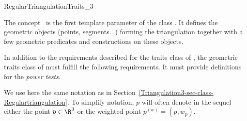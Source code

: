 

\begin{ccRefConcept}{RegularTriangulationTraits_3}

\ccDefinition
The concept \ccRefName\ is the first template parameter of the class
. It defines the geometric objects (points,
segments...) forming the triangulation together with a few geometric
predicates and constructions on these objects.

\ccRefines {}

In addition to the requirements described for the traits class of
, the geometric traits class of
 must fulfill the following requirements.
It must provide definitions for the \textit{power tests}.

We use here the same notation as in
Section~\ref{Triangulation3-sec-class-Regulartriangulation}. 
To simplify notation, $p$ will often denote in the sequel either the
point $p\in\R^3$ or the weighted point ${p}^{(w)}=(p,w_p)$.



\end{ccRefConcept}
